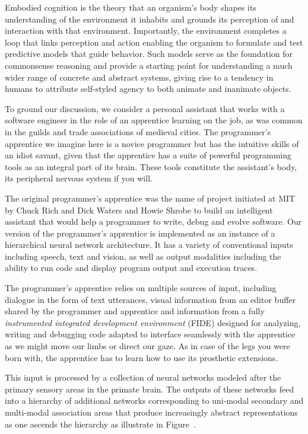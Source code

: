 

Embodied cognition is the theory that an organism's body shapes its understanding of the environment it inhabits and grounds its perception of and interaction with that environment. Importantly, the environment completes a loop that links perception and action enabling the organism to formulate and test predictive models that guide behavior. Such models serve as the foundation for commonsense reasoning and provide a starting point for understanding a much wider range of concrete and abstract systems, giving rise to a tendency in humans to attribute self-styled agency to both animate and inanimate objects.

To ground our discussion, we consider a personal assistant that works with a software engineer in the role of an apprentice learning on the job, as was common in the guilds and trade associations of medieval cities. The programmer's apprentice we imagine here is a novice programmer but has the intuitive skills of an idiot savant, given that the apprentice has a suite of powerful programming tools as an integral part of its brain. These tools constitute the assistant's body, its peripheral nervous system if you will.

The original programmer's apprentice was the name of project initiated at MIT by Chuck Rich and Dick Waters and Howie Shrobe to build an intelligent assistant that would help a programmer to write, debug and evolve software. Our version of the programmer's apprentice is implemented as an instance of a hierarchical neural network architecture. It has a variety of conventional inputs including speech, text and vision, as well as output modalities including the ability to run code and display program output and execution traces. 

The programmer's apprentice relies on multiple sources of input, including dialogue in the form of text utterances, visual information from an editor buffer shared by the programmer and apprentice and information from a fully {\it{instrumented integrated development environment}} (FIDE) designed for analyzing, writing and debugging code adapted to interface seamlessly with the apprentice as we might move our limbs or direct our gaze. As in case of the legs you were born with, the apprentice has to learn how to use its prosthetic extensions.

This input is processed by a collection of neural networks modeled after the primary sensory areas in the primate brain. The outputs of these networks feed into a hierarchy of additional networks corresponding to uni-modal secondary and multi-modal association areas that produce increasingly abstract representations as one ascends the hierarchy as illustrate in Figure~{}.
  
